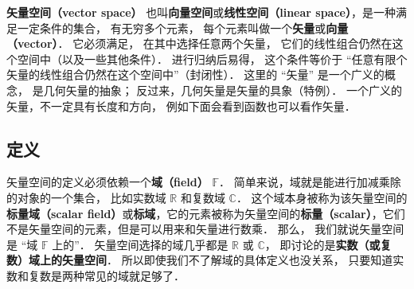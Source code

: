 

\textbf{矢量空间（vector space）} 也叫\textbf{向量空间}或\textbf{线性空间（linear space）}，是一种满足一定条件的集合， 有无穷多个元素， 每个元素叫做一个\textbf{矢量}或\textbf{向量（vector）}． 它必须满足， 在其中选择任意两个矢量， 它们的线性组合仍然在这个空间中（以及一些其他条件）． 进行归纳后易得， 这个条件等价于 “任意有限个矢量的线性组合仍然在这个空间中”（封闭性）． 这里的 “矢量” 是一个广义的概念， 是几何矢量的抽象； 反过来，几何矢量是矢量的具象（特例）． 一个广义的矢量，不一定具有长度和方向， 例如下面会看到函数也可以看作矢量．

\subsection{定义}
矢量空间的定义必须依赖一个\textbf{域（field）} $\mathbb F$． 简单来说，域就是能进行加减乘除的对象的一个集合， 比如实数域 $\mathbb R$ 和复数域 $\mathbb C$． 这个域本身被称为该矢量空间的\textbf{标量域（scalar field）}或\textbf{标域}，它的元素被称为矢量空间的\textbf{标量（scalar）}，它们不是矢量空间的元素，但是可以用来和矢量进行数乘． 那么， 我们就说矢量空间是 “域 $\mathbb{F}$ 上的”． 矢量空间选择的域几乎都是 $\mathbb{R}$ 或 $\mathbb{C}$， 即讨论的是\textbf{实数（或复数）域上的矢量空间}． 所以即使我们不了解域的具体定义也没关系， 只要知道实数和复数是两种常见的域就足够了．

